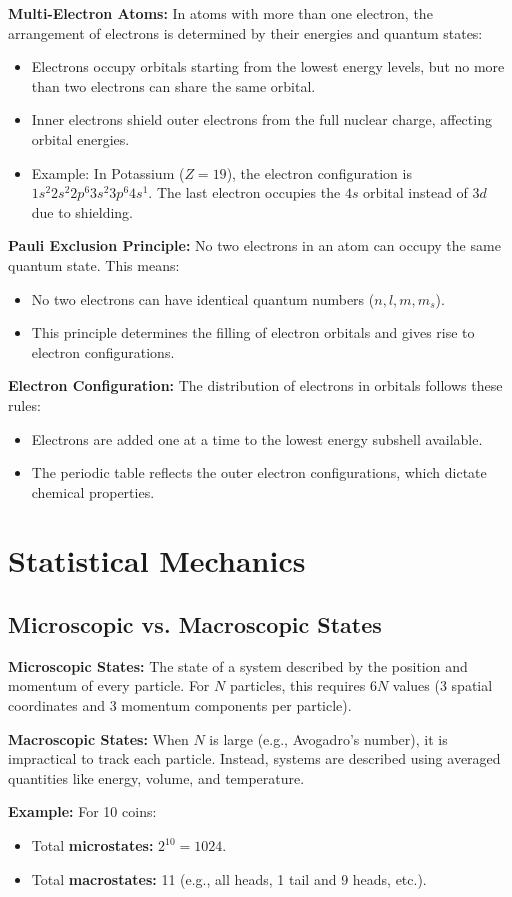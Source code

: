 \documentclass{article}
\newcommand{\conceptbox}[1]{\begin{tcolorbox}[colback=blue!10] #1 \end{tcolorbox}}
\begin{document}
\conceptbox{
\textbf{Multi-Electron Atoms:}
In atoms with more than one electron, the arrangement of electrons is determined by their energies and quantum states:
\begin{itemize}
    \item Electrons occupy orbitals starting from the lowest energy levels, but no more than two electrons can share the same orbital.
    \item Inner electrons shield outer electrons from the full nuclear charge, affecting orbital energies.
    \item Example: In Potassium (\( Z = 19 \)), the electron configuration is \( 1s^2 2s^2 2p^6 3s^2 3p^6 4s^1 \). The last electron occupies the \( 4s \) orbital instead of \( 3d \) due to shielding.
\end{itemize}
}

\conceptbox{
\textbf{Pauli Exclusion Principle:}
No two electrons in an atom can occupy the same quantum state. This means:
\begin{itemize}
    \item No two electrons can have identical quantum numbers (\( n, l, m, m_s \)).
    \item This principle determines the filling of electron orbitals and gives rise to electron configurations.
\end{itemize}
}

\conceptbox{
\textbf{Electron Configuration:}
The distribution of electrons in orbitals follows these rules:
\begin{itemize}
    \item Electrons are added one at a time to the lowest energy subshell available.
    \item The periodic table reflects the outer electron configurations, which dictate chemical properties.
\end{itemize}
}

\section{Statistical Mechanics}

\subsection{Microscopic vs. Macroscopic States}
\conceptbox{
\textbf{Microscopic States:} 
The state of a system described by the position and momentum of every particle. For \( N \) particles, this requires \( 6N \) values (3 spatial coordinates and 3 momentum components per particle).

\textbf{Macroscopic States:} 
When \( N \) is large (e.g., Avogadro's number), it is impractical to track each particle. Instead, systems are described using averaged quantities like energy, volume, and temperature.

\textbf{Example:} 
For 10 coins:
\begin{itemize}
    \item Total \textbf{microstates:} \( 2^{10} = 1024 \).
    \item Total \textbf{macrostates:} 11 (e.g., all heads, 1 tail and 9 heads, etc.).
\end{itemize}
}
\end{document}
